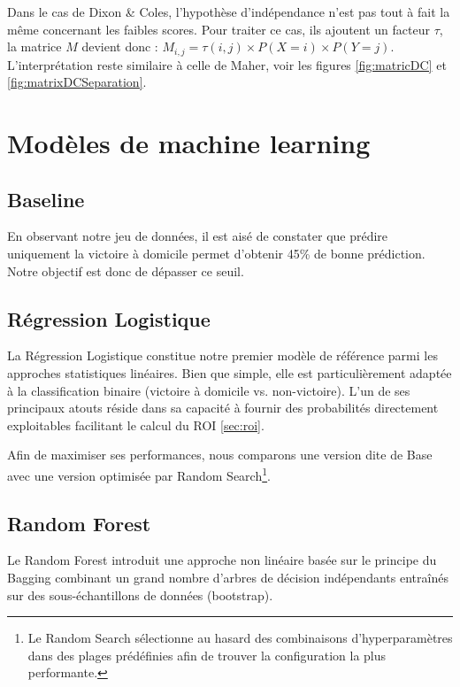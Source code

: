 Dans le cas de Dixon \& Coles, l'hypothèse d'indépendance n'est pas tout à fait la même 
concernant les faibles scores. 
Pour traiter ce cas, ils ajoutent un facteur $\tau$, la matrice $M$ devient donc : 
$M_{i,j}=\tau(i,j)\times P(X=i)\times P(Y=j)$. L'interprétation reste similaire à 
celle de Maher, voir les figures \ref{fig:matricDC} et \ref{fig:matrixDCSeparation}.


\section{Modèles de machine learning}
\label{sec:ML}

\subsection{Baseline}

En observant notre jeu de données, il est aisé de constater que prédire uniquement la 
victoire à domicile permet d'obtenir 45\% de bonne prédiction. Notre objectif est donc 
de dépasser ce seuil. 
 

\subsection{Régression Logistique}

La Régression Logistique constitue notre premier modèle de référence parmi les 
approches statistiques linéaires. Bien que simple, elle est particulièrement 
adaptée à la classification binaire (victoire à domicile vs. non-victoire). 
L'un de ses principaux atouts réside dans sa capacité à fournir des probabilités 
directement exploitables facilitant le calcul du ROI \ref{sec:roi}. 

\noindent Afin de maximiser ses performances, nous comparons une version dite de Base avec une 
version optimisée par Random Search\footnote{Le Random Search sélectionne au hasard des 
combinaisons d'hyperparamètres dans des plages prédéfinies afin de trouver la configuration 
la plus performante.}. 


\subsection{Random Forest}

Le Random Forest introduit une approche non linéaire basée sur le principe du Bagging 
combinant un grand nombre d'arbres de décision 
indépendants entraînés sur des sous-échantillons de données (bootstrap).

